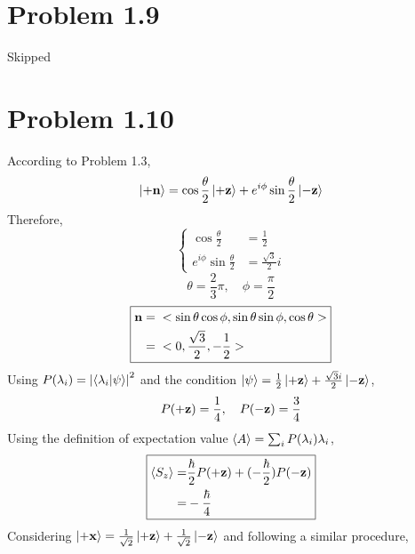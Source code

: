 \documentclass{article}
\begin{document}
\section*{Problem 1.9}
Skipped
\section*{Problem 1.10}

According to Problem 1.3,
\begin{equation} 
    \ket{\vb{+n}} = \cos{\frac{\theta}{2}} \ket{\vb{+z}} + e^{i\phi} \sin{\frac{\theta}{2}} \ket{\vb{-z}}
    \label{P1.10-orientation vector}
\end{equation}
Therefore,
\begin{equation} \nonumber
    \begin{cases}
        \cos{\frac{\theta}{2}} &= \frac{1}{2} \\
        e^{i\phi} \sin{\frac{\theta}{2}} &= \frac{\sqrt{3}}{2} i
    \end{cases}
\end{equation}
\begin{equation*}
    \theta ={} \frac{2}{3} \pi, \quad 
    \phi ={} \frac{\pi}{2}
\end{equation*}
\begin{equation} \nonumber
    \boxed{
    \begin{split}
        \vb{n} &={} 
    <\sin{\theta}\cos{\phi}, \sin{\theta}\sin{\phi},\cos{\theta}> \\
    &={}
    <0,\frac{\sqrt{3}}{2}, -\frac{1}{2}>
    \end{split}}
\end{equation}
Using $P(\lambda_i)=\abs{\braket{\lambda_i}{\psi}}^2$ and the condition $\ket{\psi}=\frac{1}{2}\ket{+\vb{z}}+\frac{\sqrt{3}i}{2}\ket{-\vb{z}}$,  
\begin{equation} \nonumber
    P(\vb{+z}) = \frac{1}{4}, \quad
    P(\vb{-z}) = \frac{3}{4}
\end{equation}
Using the definition of expectation value $\expval{A}=\sum_i{P(\lambda_i)\lambda_i}$,
\begin{equation*}
    \boxed{
    \begin{split}
        \expval{S_z} =&{} \frac{\hbar}{2} P(\vb{+z}) + (-\frac{\hbar}{2}) P(\vb{-z})\\
    =&{}  -\frac{\hbar}{4}
    \end{split}}
\end{equation*}
Considering $\ket{\vb{+x}} = \frac{1}{\sqrt{2}} \ket{\vb{+z}} + \frac{1}{\sqrt{2}} \ket{\vb{-z}}$ and following a similar procedure,
\end{document}
